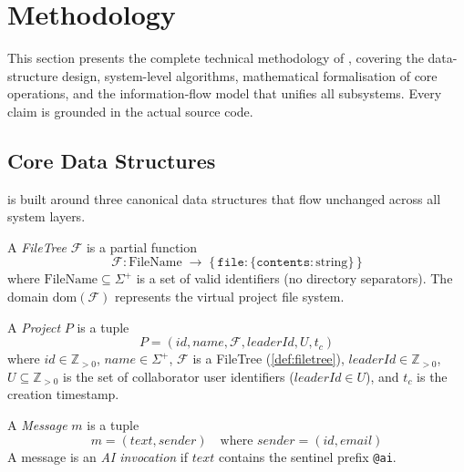 \section{Methodology}
\label{sec:methodology}

This section presents the complete technical methodology of \echoray{},
covering the data-structure design, system-level algorithms, mathematical
formalisation of core operations, and the information-flow model that unifies
all subsystems. Every claim is grounded in the actual source code.

\subsection{Core Data Structures}
\label{sub:ds}

\echoray{} is built around three canonical data structures that flow
unchanged across all system layers.

\begin{definition}[FileTree]
  \label{def:filetree}
  A \emph{FileTree} $\mathcal{F}$ is a partial function
  \[
    \mathcal{F} : \text{FileName} \;\to\; \bigl\{\,\texttt{file}: \{\texttt{contents}: \text{string}\}\,\bigr\}
  \]
  where $\text{FileName} \subseteq \Sigma^+$ is a set of valid identifiers
  (no directory separators). The domain $\mathrm{dom}(\mathcal{F})$ represents
  the virtual project file system.
\end{definition}

\begin{definition}[Project]
  \label{def:project}
  A \emph{Project} $P$ is a tuple
  \[
    P = (id, name, \mathcal{F}, leaderId, U, t_c)
  \]
  where $id \in \mathbb{Z}_{>0}$, $name \in \Sigma^+$,
  $\mathcal{F}$ is a FileTree (\cref{def:filetree}),
  $leaderId \in \mathbb{Z}_{>0}$, $U \subseteq \mathbb{Z}_{>0}$ is the set of
  collaborator user identifiers ($leaderId \in U$), and $t_c$ is the creation
  timestamp.
\end{definition}

\begin{definition}[Message]
  \label{def:message}
  A \emph{Message} $m$ is a tuple
  \[
    m = (\textit{text}, \textit{sender}) \quad
    \text{where } \textit{sender} = (\textit{id}, \textit{email})
  \]
  A message is an \emph{AI invocation} if $\textit{text}$ contains the
  sentinel prefix \texttt{@ai}.
\end{definition}

